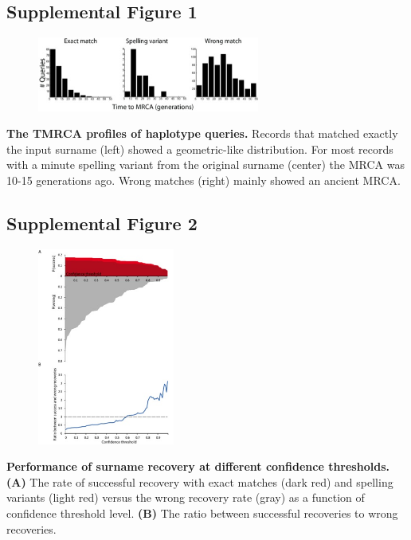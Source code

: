 \subsection{Supplemental Figure 1}
\begin{figure}[h!]
\centering
\label{fig:sursup1}
\includegraphics[width=0.65\textwidth]{Figures/App1/SuppFig1.jpg}
\end{figure}
\textbf{The TMRCA profiles of haplotype queries.} Records that matched exactly the input surname (left) showed a geometric-like distribution. For most records with a minute spelling variant from the original surname (center) the  MRCA was 10-15 generations ago. Wrong matches (right) mainly showed an ancient MRCA.

\pagebreak
\subsection{Supplemental Figure 2}
\begin{figure}[h!]
\centering
\label{fig:sursup2}
\includegraphics[width=0.4\textwidth]{Figures/App1/SuppFig2.jpg}
\end{figure}
\textbf{Performance of surname recovery at different confidence thresholds.} \textbf{(A)} The rate of successful recovery with exact matches (dark red) and spelling variants (light red) versus the wrong recovery rate (gray) as a function of confidence threshold level. \textbf{(B)} The ratio between successful recoveries to wrong recoveries.

